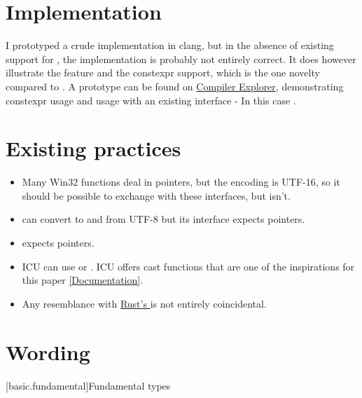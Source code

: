 \documentclass{wg21}
\begin{document}
\section{Implementation}
I prototyped a crude implementation in clang, but in the absence of existing support for , the implementation is probably not entirely correct. It does however illustrate the feature and the constexpr support, which is the one novelty compared to  .
A prototype can be found on \href{https://godbolt.org/z/d6n8b6qKd}{Compiler Explorer}, demonstrating constexpr usage and usage with an existing interface -
In this case .


\section{Existing practices}
\begin{itemize}
\item Many Win32 functions deal in  pointers, but the encoding is UTF-16, so it should be possible to exchange  with these interfaces, but isn't.
\item {} can convert to and from UTF-8 but its interface expects  pointers.
\item {} expects  pointers.
\item ICU can use  or .  ICU offers cast functions that are one of the inspirations for this paper \href{https://unicode-org.github.io/icu-docs/apidoc/dev/icu4c/namespaceicu.html#aa6035f45e4e41a4f7e7c7074e38304cd}{[Documentation]}.
\item Any resemblance with \href{https://doc.rust-lang.org/stable/std/str/fn.from_utf8_unchecked.html}{Rust's } is not entirely coincidental.
\end{itemize}

\section{Wording}

[basic.fundamental]{Fundamental types}
\end{document}
